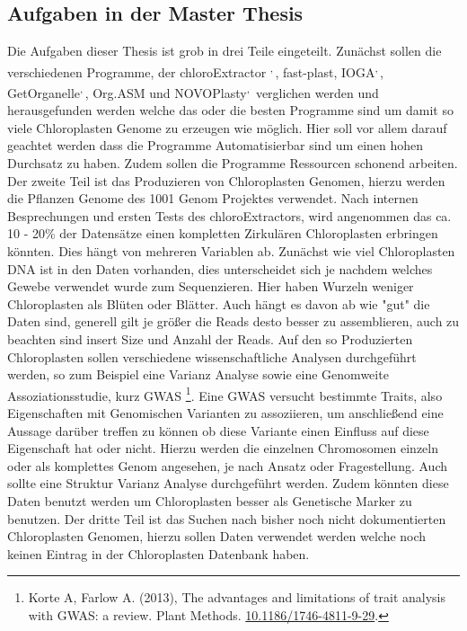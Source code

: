 \documentclass{scrartcl}
\begin{document}
\subsection{Aufgaben in der Master Thesis}
\label{sec-2-7}
Die Aufgaben dieser Thesis ist grob in drei Teile eingeteilt. Zunächst sollen die verschiedenen Programme, der chloroExtractor \footnotemark[15]{}\textsuperscript{,}\,\footnotemark[16]{}, fast-plast\footnotemark[21]{}, IOGA\footnotemark[29]{}\textsuperscript{,}\,\footnotemark[30]{}, GetOrganelle\footnotemark[27]{}\textsuperscript{,}\,\footnotemark[28]{},
Org.ASM \footnotemark[24]{}und NOVOPlasty\footnotemark[22]{}\textsuperscript{,}\,\footnotemark[23]{} verglichen werden und herausgefunden werden welche das oder die besten Programme sind um damit so viele Chloroplasten Genome zu erzeugen wie 
möglich. Hier soll vor allem darauf geachtet werden dass die Programme Automatisierbar sind um einen hohen Durchsatz zu haben. Zudem sollen die Programme Ressourcen schonend arbeiten. 
Der zweite Teil ist das Produzieren von Chloroplasten Genomen, hierzu werden die Pflanzen Genome des 1001 Genom Projektes verwendet. Nach internen Besprechungen und ersten Tests des chloroExtractors,
wird angenommen das ca. 10 - 20\% der Datensätze einen kompletten Zirkulären Chloroplasten erbringen könnten. Dies hängt von mehreren Variablen ab. Zunächst wie viel Chloroplasten DNA ist in den Daten vorhanden, dies
unterscheidet sich je nachdem welches Gewebe verwendet wurde zum Sequenzieren. Hier haben Wurzeln weniger Chloroplasten als Blüten oder Blätter. Auch hängt es davon ab wie "gut" die Daten sind, generell gilt je 
größer die Reads desto besser zu assemblieren, auch zu beachten sind insert Size und Anzahl der Reads.
Auf den so Produzierten Chloroplasten sollen verschiedene wissenschaftliche Analysen durchgeführt werden, so zum Beispiel eine Varianz Analyse sowie eine Genomweite Assoziationsstudie, kurz GWAS \footnote{Korte A, Farlow A. (2013), The advantages and limitations of trait analysis with GWAS: a review. Plant Methods. \url{10.1186/1746-4811-9-29}.}.
Eine GWAS versucht bestimmte Traits, also Eigenschaften mit Genomischen Varianten zu assoziieren, um anschließend eine Aussage darüber treffen zu können ob diese Variante einen Einfluss auf diese 
Eigenschaft hat oder nicht. Hierzu werden die einzelnen Chromosomen einzeln oder als komplettes Genom angesehen, je nach Ansatz oder Fragestellung.
Auch sollte eine Struktur Varianz Analyse durchgeführt werden. Zudem könnten diese Daten benutzt werden um Chloroplasten besser als Genetische Marker zu benutzen. 
Der dritte Teil ist das Suchen nach bisher noch nicht dokumentierten Chloroplasten Genomen, hierzu sollen Daten verwendet werden welche noch keinen Eintrag in der Chloroplasten Datenbank haben.
\end{document}

